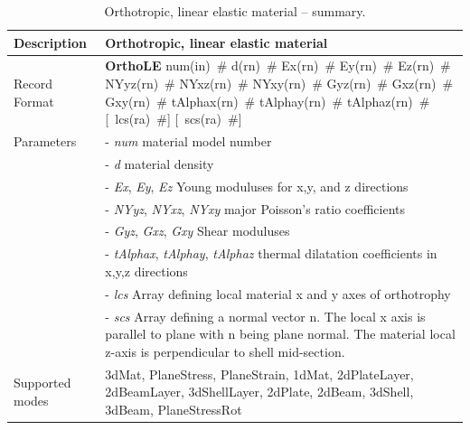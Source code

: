 \documentclass[a4paper]{article}
\newcommand{\descitem}[1]{{\noindent \bf #1}}
\newcommand{\elemparam}[2]{{{#1\tiny (#2)}~\#}}
\newcommand{\optelemparam}[2]{[{~\elemparam{#1}{#2}}]}
\newcommand{\param}[1]{{\it #1}}
\begin{document}
\begin{table}[!htb]
\begin{tabular}{|l|p{9cm}|}
\hline
Description & Orthotropic, linear elastic material\\
\hline
Record Format & \descitem{OrthoLE} \elemparam{num}{in}
\elemparam{d}{rn} \elemparam{Ex}{rn} \elemparam{Ey}{rn}
\elemparam{Ez}{rn} \elemparam{NYyz}{rn} \elemparam{NYxz}{rn} \elemparam{NYxy}{rn}
\elemparam{Gyz}{rn} \elemparam{Gxz}{rn} \elemparam{Gxy}{rn}
\elemparam{tAlphax}{rn} \elemparam{tAlphay}{rn}
\elemparam{tAlphaz}{rn} \optelemparam{lcs}{ra} \optelemparam{scs}{ra}\\
Parameters &- \param{num} material model number\\
&- \param{d} material density\\
&- \param{Ex}, \param{Ey}, \param{Ez} Young moduluses for x,y, and z directions\\
&- \param{NYyz}, \param{NYxz}, \param{NYxy} major Poisson's ratio
coefficients\\
&- \param{Gyz}, \param{Gxz}, \param{Gxy} Shear moduluses \\
&- \param{tAlphax}, \param{tAlphay}, \param{tAlphaz} thermal
dilatation coefficients in x,y,z directions\\
&- \param{lcs} Array defining local material x and y axes of orthotrophy\\
&- \param{scs} Array defining a normal vector n. The local x axis is
parallel to plane with n being plane normal. The material local z-axis
is perpendicular to shell mid-section.\\
Supported modes& 3dMat, PlaneStress, PlaneStrain, 1dMat,
2dPlateLayer, 2dBeamLayer, 3dShellLayer, 2dPlate, 2dBeam, 3dShell,
3dBeam, PlaneStressRot\\
\hline
\end{tabular}
\caption{Orthotropic, linear elastic material -- summary.}
\label{OrthoLE_table}
\end{table}
\end{document}
